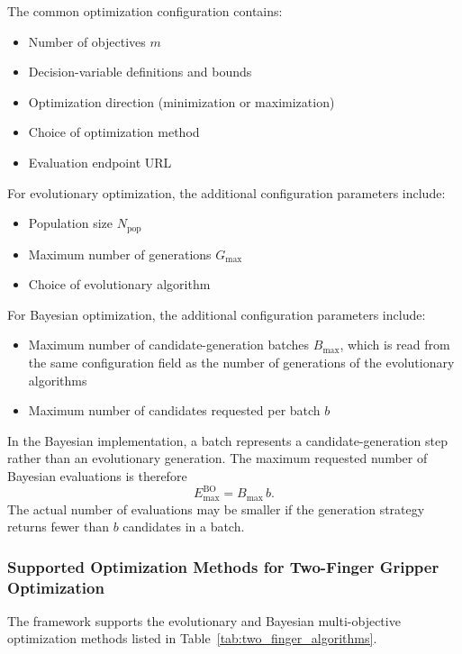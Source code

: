 The common optimization configuration contains:
\begin{itemize}
    \item Number of objectives $m$
    \item Decision-variable definitions and bounds
    \item Optimization direction (minimization or maximization)
    \item Choice of optimization method
    \item Evaluation endpoint URL
\end{itemize}

For evolutionary optimization, the additional configuration parameters include:
\begin{itemize}
    \item Population size $N_{\mathrm{pop}}$
    \item Maximum number of generations $G_{\max}$
    \item Choice of evolutionary algorithm
\end{itemize}

For Bayesian optimization, the additional configuration parameters include:
\begin{itemize}
    \item Maximum number of candidate-generation batches $B_{\max}$, which is read from the same
          configuration field as the number of generations of the evolutionary algorithms
    \item Maximum number of candidates requested per batch $b$
\end{itemize}

In the Bayesian implementation, a batch represents a candidate-generation step rather than an
evolutionary generation. The maximum requested number of Bayesian evaluations is therefore
\begin{equation}
    E_{\max}^{\mathrm{BO}} = B_{\max}\,b .
\end{equation}
The actual number of evaluations may be smaller if the generation strategy returns fewer than $b$
candidates in a batch.

\subsubsection{Supported Optimization Methods for Two-Finger Gripper Optimization}

The framework supports the evolutionary and Bayesian multi-objective optimization methods listed in
Table~\ref{tab:two_finger_algorithms}.

